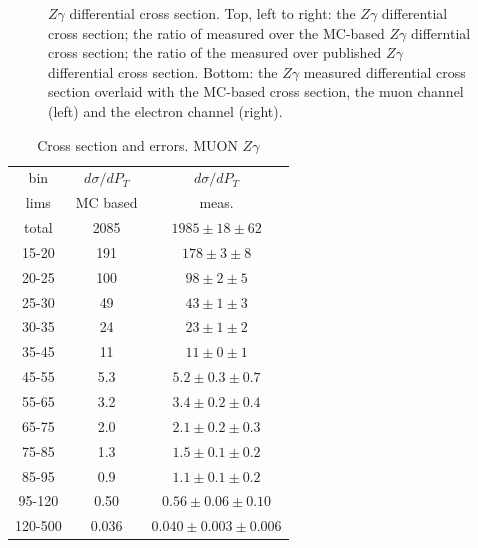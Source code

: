 \begin{figure}[htb]
\begin{center}
  \caption{$Z\gamma$ differential cross section. Top, left to right: the $Z\gamma$ differential cross section; the ratio of measured over the MC-based $Z\gamma$ differntial cross section; the ratio of the measured over published $Z\gamma$ differential cross section. Bottom:  the $Z\gamma$ measured differential cross section overlaid with the MC-based cross section, the muon channel (left) and the electron channel (right).}
  \label{fig:CS_Zg}
 \end{center}
\end{figure}
  

\begin{table}[h]
  \scriptsize
  \begin{center}
  \caption{Cross section and errors. MUON $Z\gamma$}
  \begin{tabular}{|c|c|c|}
    bin & $d\sigma/dP_{T}$ &$d\sigma/dP_{T}$ \\ 
    lims & MC based &    meas.       \\ \hline
    total & 2085 & $1985 \pm 18 \pm 62$ \\ \hline
    15-20 & 191 & $178 \pm 3 \pm 8$ \\ \hline
    20-25 & 100 & $98 \pm 2 \pm 5$ \\ \hline
    25-30 & 49 & $43 \pm 1 \pm 3$ \\ \hline
    30-35 & 24 & $23 \pm 1 \pm 2$ \\ \hline
    35-45 & 11 & $11 \pm 0 \pm 1$ \\ \hline
    45-55 & 5.3 & $5.2 \pm 0.3 \pm 0.7$ \\ \hline
    55-65 & 3.2 & $3.4 \pm 0.2 \pm 0.4$ \\ \hline
    65-75 & 2.0 & $2.1 \pm 0.2 \pm 0.3$ \\ \hline
    75-85 & 1.3 & $1.5 \pm 0.1 \pm 0.2$ \\ \hline
    85-95 & 0.9 & $1.1 \pm 0.1 \pm 0.2$ \\ \hline
    95-120 & 0.50 & $0.56 \pm 0.06 \pm 0.10$ \\ \hline
    120-500 & 0.036 & $0.040 \pm 0.003 \pm 0.006$ \\ \hline
  \end{tabular}
  \label{tab:sc_mc_vs_meas_MUON_ZGamma}
  \end{center}
\end{table}

